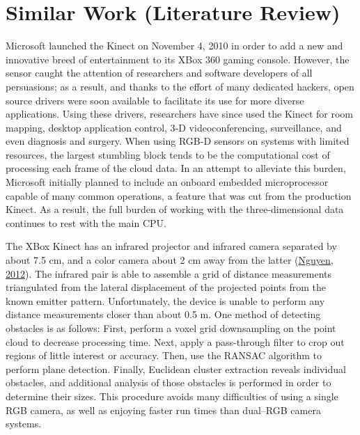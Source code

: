 \documentclass[12pt]{report}
\begin{document}
\section{Similar Work (Literature Review)}
Microsoft launched the Kinect on November 4, 2010 in order to add a new and innovative breed of entertainment to its XBox 360 gaming console.  However, the sensor caught the attention of researchers and software developers of all persuasions; as a result, and thanks to the effort of many dedicated hackers, open source drivers were soon available to facilitate its use for more diverse applications.  Using these drivers, researchers have since used the Kinect for room mapping, desktop application control, 3-D videoconferencing, surveillance, and even diagnosis and surgery.  When using RGB-D sensors on systems with limited resources, the largest stumbling block tends to be the computational cost of processing each frame of the cloud data.  In an attempt to alleviate this burden, Microsoft initially planned to include an onboard embedded microprocessor capable of many common operations, a feature that was cut from the production Kinect.  As a result, the full burden of working with the three-dimensional data continues to rest with the main CPU.

The XBox Kinect has an infrared projector and infrared camera separated by about 7.5 cm, and a color camera about 2 cm away from the latter (\hyperref[bib:nguyen]{Nguyen, 2012}).  The infrared pair is able to assemble a grid of distance measurements triangulated from the lateral displacement of the projected points from the known emitter pattern.  Unfortunately, the device is unable to perform any distance measurements closer than about 0.5 m.  One method of detecting obstacles is as follows:  First, perform a voxel grid downsampling on the point cloud to decrease processing time.  Next, apply a pass-through filter to crop out regions of little interest or accuracy.  Then, use the RANSAC algorithm to perform plane detection.  Finally, Euclidean cluster extraction reveals individual obstacles, and additional analysis of those obstacles is performed in order to determine their sizes.  This procedure avoids many difficulties of using a single RGB camera, as well as enjoying faster run times than dual--RGB camera systems.
\end{document}
